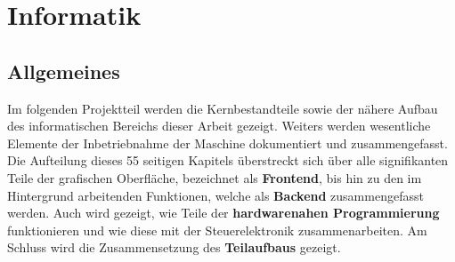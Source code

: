 \chapter{Informatik}\label{ch:informatik}
\section{Allgemeines}\label{sec:einleitung}
Im folgenden Projektteil werden die Kernbestandteile sowie der nähere Aufbau des informatischen Bereichs dieser Arbeit gezeigt.
Weiters werden wesentliche Elemente der Inbetriebnahme der Maschine dokumentiert und zusammengefasst.
Die Aufteilung dieses 55 seitigen Kapitels überstreckt sich über alle signifikanten Teile der grafischen Oberfläche, bezeichnet als \textbf{Frontend}, bis hin zu den im Hintergrund arbeitenden Funktionen, welche als \textbf{Backend} zusammengefasst werden.
Auch wird gezeigt, wie Teile der \textbf{hardwarenahen Programmierung} funktionieren und wie diese mit der Steuerelektronik zusammenarbeiten.
Am Schluss wird die Zusammensetzung des \textbf{Teilaufbaus} gezeigt.
